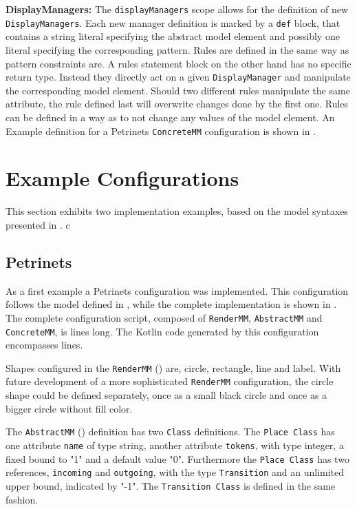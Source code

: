 \textbf{DisplayManagers:} The \texttt{displayManagers} scope allows for the definition of new \texttt{DisplayManagers}. Each new manager definition is marked by a \texttt{def} block, that contains a string literal specifying the abstract model element and possibly one literal specifying the corresponding pattern. 
Rules are defined in the same way as pattern constraints are. A rules statement block on the other hand has no specific return type. Instead they directly act on a given \texttt{DisplayManager} and manipulate the corresponding model element. Should two different rules manipulate the same attribute, the rule defined last will overwrite changes done by the first one. Rules can be defined in a way as to not change any values of the model element. An Example definition for a Petrinets \texttt{ConcreteMM} configuration is shown in .

\section{Example Configurations}
\label{sec:example-configs}
This section exhibits two implementation examples, based on the model syntaxes presented in .
c 
\subsection{Petrinets}
\label{sec:petri-impl}
As a first example a Petrinets configuration was implemented. This configuration follows the model defined in , while the complete implementation is shown in . The complete configuration script, composed of \texttt{RenderMM}, \texttt{AbstractMM} and \texttt{ConcreteMM}, is \petriConfigLoC lines long. The Kotlin code generated by this configuration encompasses \petriGeneratedLoC lines. 

Shapes configured in the \texttt{RenderMM} () are, circle, rectangle, line and label. With future development of a more sophisticated \texttt{RenderMM} configuration, the circle shape could be defined separately, once as a small black circle and once as a bigger circle without fill color. 

The \texttt{AbstractMM} () definition has two \texttt{Class} definitions. The \texttt{Place Class} has one attribute \texttt{name} of type string, another attribute \texttt{tokens}, with type integer, a fixed bound to "1" and a default value "0". Furthermore the \texttt{Place Class} has two references, \texttt{incoming} and \texttt{outgoing}, with the type \texttt{Transition} and an unlimited upper bound, indicated by "-1". The \texttt{Transition Class} is defined in the same fashion.

